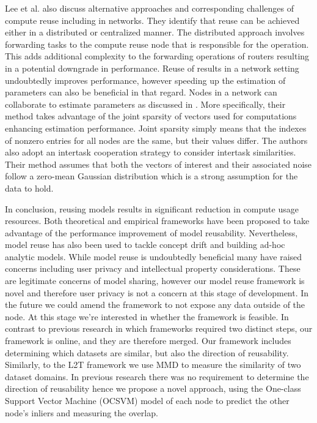 \documentclass{mprop}
\begin{document}
Lee et al. \cite{ComputeReuse} also discuss alternative approaches and corresponding challenges of compute reuse including in networks. They identify that reuse can be achieved either in a distributed or centralized manner. The distributed approach involves forwarding tasks to the compute reuse node that is responsible for the operation. This adds additional complexity to the forwarding operations of routers resulting in a potential downgrade in performance. Reuse of results in a network setting undoubtedly improves performance, however speeding up the estimation of parameters can also be beneficial in that regard. Nodes in a network can collaborate to estimate parameters as discussed in \cite{DistributedEstimation}. More specifically, their method takes advantage of the joint sparsity of vectors used for computations enhancing estimation performance. Joint sparsity simply means that the indexes of nonzero entries for all nodes are the same, but their values differ.  The authors also adopt an intertask cooperation strategy to consider intertask similarities. Their method assumes that both the vectors of interest and their associated noise follow a zero-mean Gaussian distribution which is a strong assumption for the data to hold.

In conclusion, reusing models results in significant reduction in compute usage resources. Both theoretical and empirical frameworks have been proposed to take advantage of the performance improvement of model reusability. Nevertheless, model reuse has also been used to tackle concept drift and building ad-hoc analytic models. While model reuse is undoubtedly beneficial many have raised concerns including user privacy and intellectual property considerations. These are legitimate concerns of model sharing, however  our model reuse  framework is novel and therefore user privacy is not a concern at this stage of development. In the future we could amend the framework to not expose any data outside of the node. At this stage we're interested in whether the framework is feasible. In contrast to previous research in which frameworks required two distinct steps, our framework is online, and they are therefore merged. Our framework includes determining which datasets are similar, but also the direction of reusability.  Similarly, to the L2T \cite{L2T} framework we use MMD to measure the similarity of two dataset domains. In previous research there was no requirement to determine the direction of reusability hence we propose a novel approach, using the One-class Support Vector Machine (OCSVM)  model of each node to predict the other node’s inliers and measuring the overlap.
\end{document}
